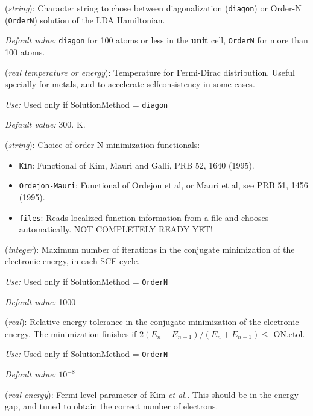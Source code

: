 \begin{description}
\itemsep 10pt
\parsep 0pt

\item[{\bf SolutionMethod}] ({\it string}): Character string to chose between
diagonalization ({\tt diagon}) or Order-N ({\tt OrderN}) solution
of the LDA Hamiltonian.

{\it Default value:} {\tt diagon} for 100 atoms or less in the 
{\bf unit} cell, {\tt OrderN} for more than 100 atoms.

\item[{\bf ElectronicTemperature}] ({\it real temperature or energy}):
Temperature for Fermi-Dirac distribution. Useful specially for
metals, and to accelerate selfconsistency in some cases.

{\it Use:} Used only if SolutionMethod = {\tt diagon}

{\it Default value:} 300. K.


\item[{\bf ON.functional}] ({\it string}): Choice of order-N minimization
functionals:
\begin{itemize}
\item {\tt Kim}: Functional of Kim, Mauri and Galli, PRB 52, 1640 (1995).
\item {\tt Ordejon-Mauri}: Functional of Ordejon et al, or Mauri et al,
see PRB 51, 1456 (1995).
\item {\tt files}: Reads localized-function information from a file and 
chooses automatically. NOT COMPLETELY READY YET!
\end{itemize}

\item[{\bf ON.MaxNumIter}] ({\it integer}): Maximum number of iterations
in the conjugate minimization of the electronic
energy, in each SCF cycle.

{\it Use:} Used only if SolutionMethod = {\tt OrderN}

{\it Default value:} 1000

\item[{\bf ON.etol}] ({\it real}): Relative-energy tolerance in the 
conjugate minimization of the electronic
energy. The minimization finishes if 
\hspace{0.2truecm} $2 (E_n - E_{n-1}) / (E_n + E_{n-1}) \leq $ ON.etol.

{\it Use:} Used only if SolutionMethod = {\tt OrderN}

{\it Default value:} $10^{-8}$

\item[{\bf ON.eta}] ({\it real energy}): Fermi level parameter of Kim 
{\it et al.}. This should be in the energy gap, and tuned to obtain
the correct number of electrons.


\end{description}
